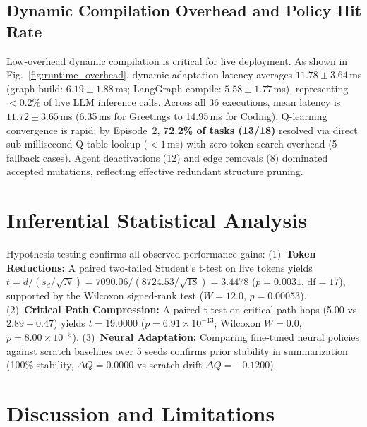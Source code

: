 \documentclass[conference]{IEEEtran}
\begin{document}
\subsection{Dynamic Compilation Overhead and Policy Hit Rate}
Low-overhead dynamic compilation is critical for live deployment. As shown in Fig.~\ref{fig:runtime_overhead}, dynamic adaptation latency averages $\mathbf{11.78 \pm 3.64}$\,ms (graph build: $6.19 \pm 1.88$\,ms; LangGraph compile: $5.58 \pm 1.77$\,ms), representing $<0.2\%$ of live LLM inference calls. Across all 36 executions, mean latency is $11.72 \pm 3.65$\,ms (6.35\,ms for Greetings to 14.95\,ms for Coding). Q-learning convergence is rapid: by Episode~2, \textbf{72.2\% of tasks (13/18)} resolved via direct sub-millisecond Q-table lookup ($<1$\,ms) with zero token search overhead (5 fallback cases). Agent deactivations (12) and edge removals (8) dominated accepted mutations, reflecting effective redundant structure pruning.

\section{Inferential Statistical Analysis}
\label{sec:statistical_analysis}

Hypothesis testing confirms all observed performance gains:
(1)~\textbf{Token Reductions:} A paired two-tailed Student's t-test on live tokens yields $t = \bar{d}/(s_d/\sqrt{N}) = 7090.06 / (8724.53/\sqrt{18}) = \mathbf{3.4478}$ ($p = 0.0031$, $\mathrm{df}=17$), supported by the Wilcoxon signed-rank test ($W = 12.0$, $p = 0.00053$).
(2)~\textbf{Critical Path Compression:} A paired t-test on critical path hops (5.00 vs $\mathbf{2.89 \pm 0.47}$) yields $t = \mathbf{19.0000}$ ($p = 6.91 \times 10^{-13}$; Wilcoxon $W = 0.0$, $p = 8.00 \times 10^{-5}$).
(3)~\textbf{Neural Adaptation:} Comparing fine-tuned neural policies against scratch baselines over 5 seeds confirms prior stability in summarization (100\% stability, $\Delta Q = 0.0000$ vs scratch drift $\Delta Q = -0.1200$).

\section{Discussion and Limitations}
\label{sec:discussion}
\end{document}
